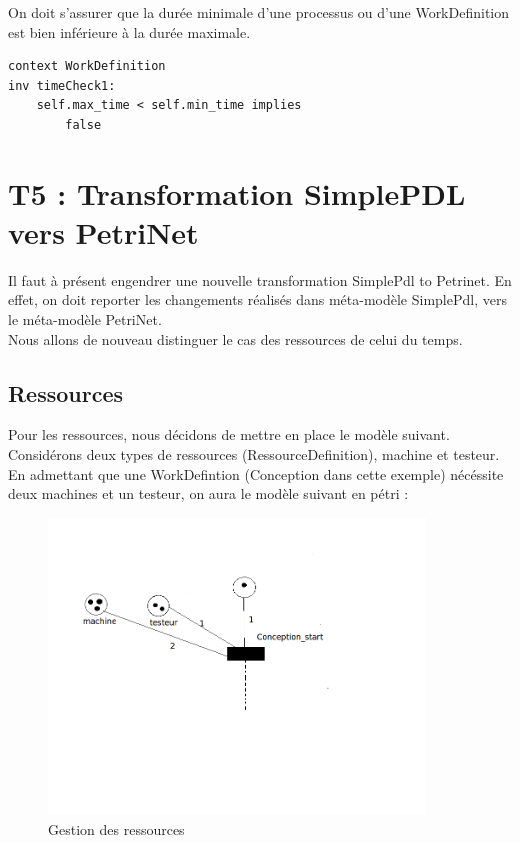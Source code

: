 \documentclass{report}
\begin{document}
On doit s'assurer que la durée minimale d'une processus ou d'une WorkDefinition est bien inférieure à la durée maximale.

\begin{verbatim}
context WorkDefinition
inv timeCheck1:
	self.max_time < self.min_time implies
		false
\end{verbatim}

\section{T5 : Transformation SimplePDL vers PetriNet}

Il faut à présent engendrer une nouvelle transformation SimplePdl to Petrinet. En effet, on doit reporter les changements réalisés dans méta-modèle SimplePdl, vers le méta-modèle PetriNet.\\

Nous allons de nouveau distinguer le cas des ressources de celui du temps.

\subsection{Ressources}

Pour les ressources, nous décidons de mettre en place le modèle suivant. Considérons deux types de ressources (RessourceDefinition), machine et testeur.
En admettant que une WorkDefintion (Conception dans cette exemple) nécéssite deux machines et un testeur, on aura le modèle suivant en pétri :\\

\begin{figure}[!h] 
\begin{center}
\includegraphics[width=10cm]{petri1.png}
\caption{Gestion des ressources} 
\label{img1} 
\end{center}
\end{figure} 
\end{document}

